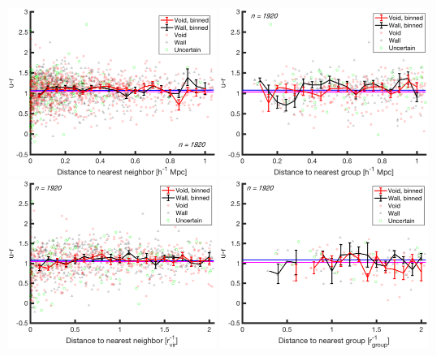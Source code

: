 \begin{figure}
    \includegraphics[width=0.49\textwidth]{Images/smallScaleEnvironment/1sig_dwarf_I06relations_absDist_ur}
    \includegraphics[width=0.49\textwidth]{Images/smallScaleEnvironment/1sig_dwarf_I06relations_groupAbsDist_ur}
    \includegraphics[width=0.49\textwidth]{Images/smallScaleEnvironment/1sig_dwarf_I06relations_virDist_ur}
    \includegraphics[width=0.49\textwidth]{Images/smallScaleEnvironment/1sig_dwarf_I06relations_groupRDist_ur}

\end{figure}
